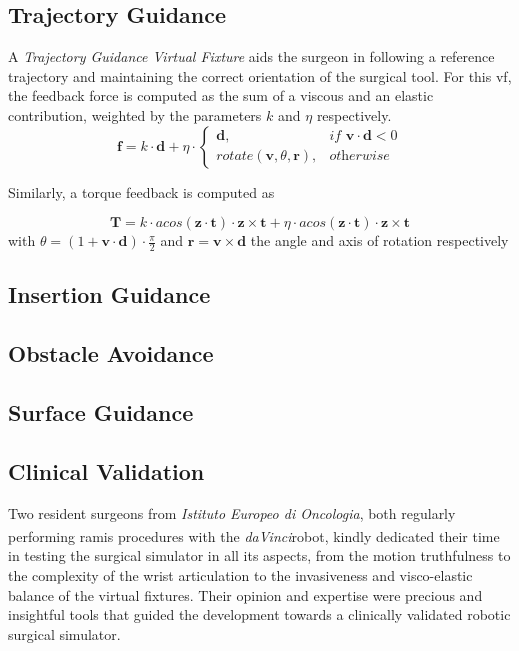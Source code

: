 \documentclass{article}
\newcommand{\cright}{\textsuperscript{\textregistered}\phantom{..}}
\newcommand{\vect}[1]{\textbf{#1}}
\begin{document}
\begin{multicols}{2}
\subsection{Trajectory Guidance}
A \textit{Trajectory Guidance Virtual Fixture} aids the surgeon in following a reference trajectory and maintaining the correct orientation of the surgical tool. For this \ac{vf}, the feedback force is computed as the sum of a viscous and an elastic contribution, weighted by the parameters $k$ and $\eta$ respectively.
\begin{equation}
    \vect{f} = k \cdot \vect{d} + \eta \cdot
    \begin{cases} 
        \vect{d}, & \textit{if         } \vect{v}\cdot\vect{d}<0 \\
         rotate(\vect{v},\theta,\vect{r}), & \textit{otherwise}
    \end{cases}
    \label{eq:trajVFforce}
\end{equation} 

\noindent Similarly, a torque feedback is computed as

\begin{equation}
  \vect{T} = k \cdot acos (\vect{z}\cdot\vect{t} ) \cdot \vect{z} \times \vect{t} + \eta \cdot acos (\vect{z}\cdot\vect{t} ) \cdot \vect{z} \times \vect{t}
    \label{eq:trajVFtorque}
  \end{equation}
with $\theta = (1+\vect{v}\cdot\vect{d})\cdot\frac{\pi}{2}$ and $\vect{r} = \vect{v}\times\vect{d}$ the angle and axis of rotation respectively

\subsection{Insertion Guidance}
\subsection{Obstacle Avoidance}
\subsection{Surface Guidance}

\subsection{Clinical Validation}
Two resident surgeons from \textit{Istituto Europeo di Oncologia}, both regularly performing \ac{ramis} procedures with the \textit{daVinci}\cright robot, kindly dedicated their time in testing the surgical simulator in all its aspects, from the motion truthfulness to the complexity of the wrist articulation to the invasiveness and visco-elastic balance of the virtual fixtures. Their opinion and expertise were precious and insightful tools that guided the development towards a clinically validated robotic surgical simulator. 


\end{multicols}
\end{document}
